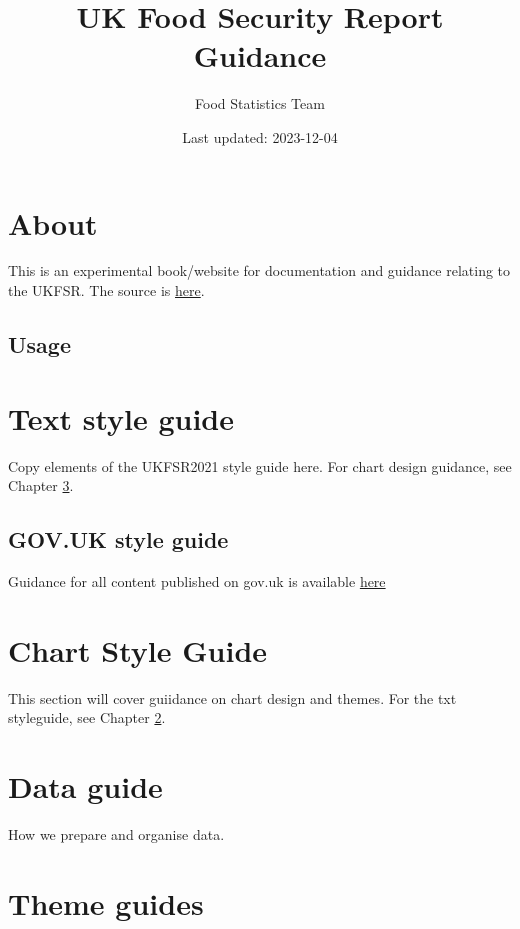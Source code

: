 \documentclass[
]{book}
\title{UK Food Security Report Guidance}
\author{Food Statistics Team}
\date{Last updated: 2023-12-04}
\begin{document}
\maketitle

{
\setcounter{tocdepth}{1}
\tableofcontents
}
\hypertarget{about}{%
\chapter{About}\label{about}}

This is an experimental book/website for documentation and guidance relating to the UKFSR. The source is \href{https://github.com/FoodchainStats/ukfsr-docs}{here}.

\hypertarget{usage}{%
\section{Usage}\label{usage}}

\hypertarget{text}{%
\chapter{Text style guide}\label{text}}

Copy elements of the UKFSR2021 style guide here. For chart design guidance, see
Chapter \ref{chart}.

\hypertarget{gov.uk-style-guide}{%
\section{GOV.UK style guide}\label{gov.uk-style-guide}}

Guidance for all content published on gov.uk is available \href{https://www.gov.uk/guidance/style-guide}{here}

\hypertarget{chart}{%
\chapter{Chart Style Guide}\label{chart}}

This section will cover guiidance on chart design and themes. For the txt
styleguide, see Chapter \ref{text}.

\hypertarget{data-guide}{%
\chapter{Data guide}\label{data-guide}}

How we prepare and organise data.

\hypertarget{theme-guides}{%
\chapter{Theme guides}\label{theme-guides}}
\end{document}
